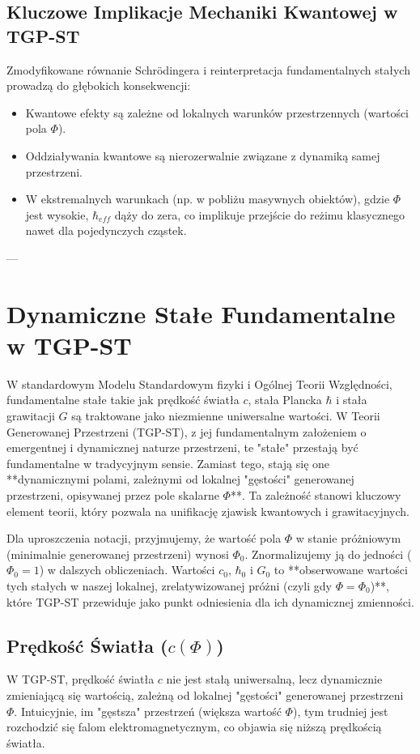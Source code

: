 \documentclass[11pt,a4paper]{article}
\begin{document}
\subsection{Kluczowe Implikacje Mechaniki Kwantowej w TGP-ST}
Zmodyfikowane równanie Schrödingera i reinterpretacja fundamentalnych stałych prowadzą do głębokich konsekwencji:
\begin{itemize}
    \item Kwantowe efekty są zależne od lokalnych warunków przestrzennych (wartości pola $\Phi$).
    \item Oddziaływania kwantowe są nierozerwalnie związane z dynamiką samej przestrzeni.
    \item W ekstremalnych warunkach (np. w pobliżu masywnych obiektów), gdzie $\Phi$ jest wysokie, $\hbar_{eff}$ dąży do zera, co implikuje przejście do reżimu klasycznego nawet dla pojedynczych cząstek.
\end{itemize}

---

\section{Dynamiczne Stałe Fundamentalne w TGP-ST}
\label{sec:StaleDynamiczne}

W standardowym Modelu Standardowym fizyki i Ogólnej Teorii Względności, fundamentalne stałe takie jak prędkość światła $c$, stała Plancka $\hbar$ i stała grawitacji $G$ są traktowane jako niezmienne uniwersalne wartości. W Teorii Generowanej Przestrzeni (TGP-ST), z jej fundamentalnym założeniem o emergentnej i dynamicznej naturze przestrzeni, te "stałe" przestają być fundamentalne w tradycyjnym sensie. Zamiast tego, stają się one **dynamicznymi polami, zależnymi od lokalnej "gęstości" generowanej przestrzeni, opisywanej przez pole skalarne $\Phi$**. Ta zależność stanowi kluczowy element teorii, który pozwala na unifikację zjawisk kwantowych i grawitacyjnych.

Dla uproszczenia notacji, przyjmujemy, że wartość pola $\Phi$ w stanie próżniowym (minimalnie generowanej przestrzeni) wynosi $\Phi_0$. Znormalizujemy ją do jedności ($\Phi_0=1$) w dalszych obliczeniach. Wartości $c_0$, $\hbar_0$ i $G_0$ to **obserwowane wartości tych stałych w naszej lokalnej, zrelatywizowanej próżni (czyli gdy $\Phi=\Phi_0$)**, które TGP-ST przewiduje jako punkt odniesienia dla ich dynamicznej zmienności.

\subsection{Prędkość Światła ($c(\Phi)$)}
W TGP-ST, prędkość światła $c$ nie jest stałą uniwersalną, lecz dynamicznie zmieniającą się wartością, zależną od lokalnej "gęstości" generowanej przestrzeni $\Phi$. Intuicyjnie, im "gęstsza" przestrzeń (większa wartość $\Phi$), tym trudniej jest rozchodzić się falom elektromagnetycznym, co objawia się niższą prędkością światła.
\end{document}
